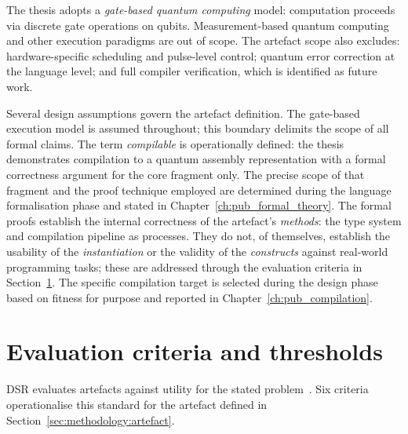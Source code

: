 The thesis adopts a \textit{gate-based quantum computing} model: computation proceeds via discrete gate operations on qubits.
Measurement-based quantum computing and other execution paradigms are out of scope.
The artefact scope also excludes: hardware-specific scheduling and pulse-level control; quantum error correction at the language level; and full compiler verification, which is identified as future work.

Several design assumptions govern the artefact definition.
The gate-based execution model is assumed throughout; this boundary delimits the scope of all formal claims.
The term \textit{compilable} is operationally defined: the thesis demonstrates compilation to a quantum assembly representation with a formal correctness argument for the core fragment only.
The precise scope of that fragment and the proof technique employed are determined during the language formalisation phase and stated in Chapter~\ref{ch:pub_formal_theory}.
The formal proofs establish the internal correctness of the artefact's \textit{methods}: the type system and compilation pipeline as processes.
They do not, of themselves, establish the usability of the \textit{instantiation} or the validity of the \textit{constructs} against real-world programming tasks; these are addressed through the evaluation criteria in Section~\ref{sec:methodology:evaluation}.
The specific compilation target is selected during the design phase based on fitness for purpose and reported in Chapter~\ref{ch:pub_compilation}.


\section{Evaluation criteria and thresholds}\label{sec:methodology:evaluation}
DSR evaluates artefacts against utility for the stated problem~\cite{Hevner2004DesignScienceIS}.
Six criteria operationalise this standard for the artefact defined in Section~\ref{sec:methodology:artefact}.


